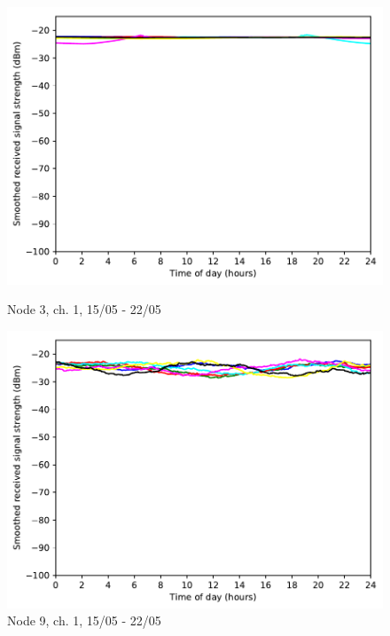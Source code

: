 \documentclass[a4paper, 11pt]{article}
\begin{document}
\begin{figure}
\begin{minipage}{0.47\textwidth}
    \centering
	\includegraphics[width=\textwidth]{images/2_4_GHz/cot-node3-student_2017-05-21_chan1_image}
    \caption{Node 3, ch. 1, 15/05 - 22/05} \label{node3-1}
\end{minipage}\hfill
\begin{minipage}{0.47\textwidth}
    \centering
	\includegraphics[width=\textwidth]{images/2_4_GHz/cot-node9-student_2017-05-21_chan1_image}
    \caption{Node 9, ch. 1, 15/05 - 22/05} \label{node9-1}


\end{minipage}
\end{figure}
\end{document}
